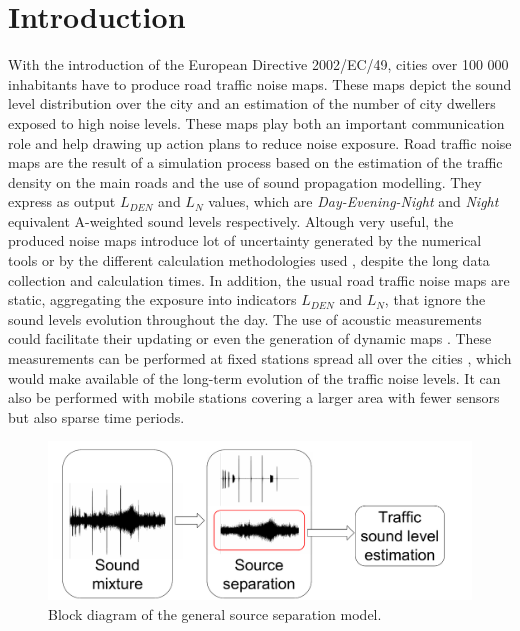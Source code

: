 \documentclass[twocolumn]{svjour3}          %
\begin{document}
\section{Introduction} \label{part:intro}

With the introduction of the European Directive 2002/\-EC/49, cities over 100 000 inhabitants have to produce road traffic noise maps. These maps depict the sound level distribution over the city and an estimation of the number of city dwellers exposed to high noise levels. These maps play both an important communication role and help drawing up action plans to reduce noise exposure. Road traffic noise maps are the result of a simulation process based on the estimation of the traffic density on the main roads and the use of sound propagation modelling. They express as output $L_ {DEN}$ and $L_N$ values, which are \textit{Day-Evening-Night} and \textit{Night} equivalent A-weighted sound levels respectively. Altough very useful, the produced noise maps introduce lot of uncertainty generated by the numerical tools \cite{van_leeuwen_noise_2015} or by the different calculation methodologies used \cite{leroy_uncertainty_2010}\cite{garg_critical_2014}, despite the long data collection and calculation times. In addition, the usual road traffic noise maps are static, aggregating the exposure into indicators $L_{DEN}$ and $L_N$, that ignore the sound levels evolution throughout the day.
The use of acoustic measurements could facilitate their updating or even the generation of dynamic maps \cite{wei_dynamic_2016}. These measurements can be performed at fixed stations spread all over the cities \cite{Mioduszewski} \cite{mietlicki2012innovative}, which would make available of the long-term evolution of the traffic noise levels. It can also be performed with  mobile stations \cite{can_exploring_2012} \cite{manvell2004sadmam} covering a larger area with fewer sensors but also sparse time periods.

\begin{figure}[t]
\centering
\includegraphics[width=\linewidth]{figures/bloc_diagram_source_separation.pdf}
\caption{Block diagram of the general source separation model.}
\label{fig:diagram}
\end{figure}
\end{document}

